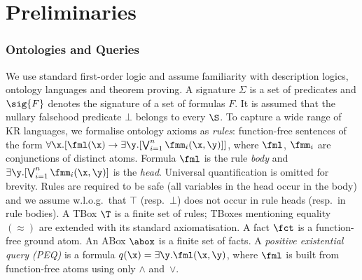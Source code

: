 
\section{Preliminaries}
\label{sec:prelim}

\subsubsection{Ontologies and Queries} We use standard first-order
logic  and assume familiarity with
description logics, ontology languages and theorem proving. 
A signature $\Sigma$ is a set of predicates and
 $\sig{F}$ denotes the signature of a set of formulas $F$.
It is assumed that the nullary falsehood predicate $\bot$ belongs to every $\S$. 
To capture a wide range of KR languages, we formalise
ontology axioms as  \emph{rules}: function-free sentences 
of the form
$\forall \x.[\fml(\x)
\rightarrow\exists\y.[\bigvee_{i=1}^n\fmm_i(\x,\y)]]$,
where $\fml$, $\fmm_i$ are conjunctions of distinct atoms. 
Formula $\fml$ is the rule \emph{body}  and $\exists
\y.[\bigvee_{i=1}^n\fmm_i(\x,\y)]$ is the \emph{head}. 
Universal quantification is omitted for brevity.
Rules are required to be
safe (all variables in the head occur in the body) and
we assume
w.l.o.g.\ that $\top$ (resp.\ $\bot$) does not occur in rule heads 
(resp.\ in rule bodies). A TBox
$\T$ is a finite set of rules; 
TBoxes mentioning equality $(\approx)$ are extended
with its standard axiomatisation.
A fact $\fct$ is a function-free ground atom. 
An ABox $\abox$ is a finite set of facts.
A \emph{positive existential query (PEQ)} is a formula $q(\x) = \exists \y.
\fml(\x,\y)$, where $\fml$ is built from function-free atoms using only $\land$ and~$\lor$.
  

